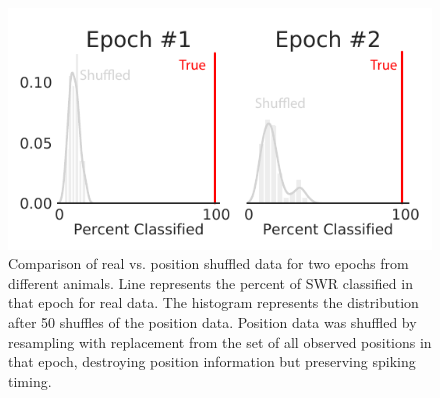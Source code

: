 \documentclass[times, twoside]{zHenriquesLab-StyleBioRxiv}
\begin{document}
\begin{figure}%
\centering
\includegraphics[width=0.80\linewidth]{figures/Figure3-supplemental2/Figure3_v1-supplemental2}
\caption{Comparison of real vs. position shuffled data for two epochs from different animals. Line represents the percent of SWR classified in that epoch for real data. The histogram represents the distribution after 50 shuffles of the position data. Position data was shuffled by resampling with replacement from the set of all observed positions in that epoch, destroying position information but preserving spiking timing.}
\label{fig:Figure3-Figure supplement 2}
\end{figure}

\end{document}
